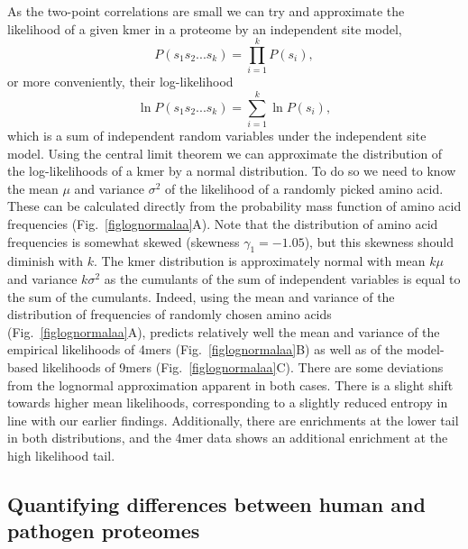 \documentclass[superscriptaddress,twocolumn,pre]{revtex4}
\newcommand{\<}{\langle}
\renewcommand{\>}{\rangle}
\begin{document}
As the two-point correlations are small we can try and approximate the likelihood of a given kmer in a proteome by an independent site model,
\begin{equation}
    P(s_1s_2 ... s_k) = \prod_{i=1}^k P(s_i),
\end{equation}
or more conveniently, their log-likelihood
\begin{equation}
    \ln P(s_1s_2 ... s_k) = \sum_{i=1}^k \ln P(s_i),
\end{equation}
which is a sum of independent random variables under the independent site model.
Using the central limit theorem we can approximate the distribution of the log-likelihoods of a kmer by a normal distribution. To do so we need to know the mean $\mu$ and variance $\sigma^2$ of the likelihood of a randomly picked amino acid. These can be calculated directly from the probability mass function of amino acid frequencies (Fig.~\ref{figlognormalaa}A). Note that the distribution of amino acid frequencies is somewhat skewed (skewness $\gamma_1 = -1.05$), but this skewness should diminish with $k$. The kmer distribution is approximately normal with mean $k \mu$ and variance $k \sigma^2$ as the cumulants of the sum of independent variables is equal to the sum of the cumulants.  Indeed, using the mean and variance of the distribution of frequencies of randomly chosen amino acids (Fig.~\ref{figlognormalaa}A), predicts relatively well the mean and variance of the empirical likelihoods of 4mers (Fig.~\ref{figlognormalaa}B) as well as of the model-based likelihoods of 9mers (Fig.~\ref{figlognormalaa}C). There are some deviations from the lognormal approximation apparent in both cases. There is a slight shift towards higher mean likelihoods, corresponding to a slightly reduced entropy in line with our earlier findings. Additionally, there are enrichments at the lower tail in both distributions, and the 4mer data shows an additional enrichment at the high likelihood tail.


\subsection{Quantifying differences between human and pathogen proteomes}
\end{document}
